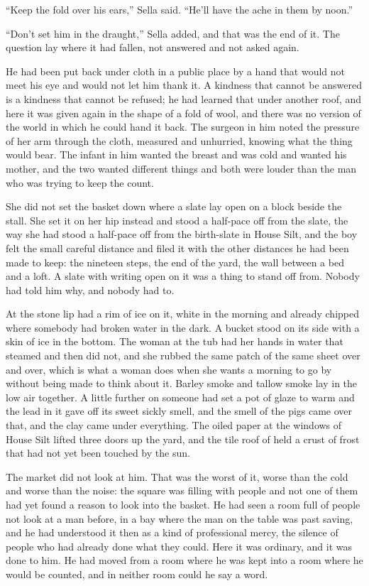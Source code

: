 “Keep the fold over his ears,” Sella said. “He'll have the ache in them by noon.”

“Don't set him in the draught,” Sella added, and that was the end of it. The question lay where it had fallen, not answered and not asked again.

He had been put back under cloth in a public place by a hand that would not meet his eye and would not let him thank it. A kindness that cannot be answered is a kindness that cannot be refused; he had learned that under another roof, and here it was given again in the shape of a fold of wool, and there was no version of the world in which he could hand it back. The surgeon in him noted the pressure of her arm through the cloth, measured and unhurried, knowing what the thing would bear. The infant in him wanted the breast and was cold and wanted his mother, and the two wanted different things and both were louder than the man who was trying to keep the count.

She did not set the basket down where a slate lay open on a block beside the stall. She set it on her hip instead and stood a half-pace off from the slate, the way she had stood a half-pace off from the birth-slate in House Silt, and the boy felt the small careful distance and filed it with the other distances he had been made to keep: the nineteen steps, the end of the yard, the wall between a bed and a loft. A slate with writing open on it was a thing to stand off from. Nobody had told him why, and nobody had to.

\scenebreak

At  the stone lip had a rim of ice on it, white in the morning and already chipped where somebody had broken water in the dark. A bucket stood on its side with a skin of ice in the bottom. The woman at the tub had her hands in water that steamed and then did not, and she rubbed the same patch of the same sheet over and over, which is what a woman does when she wants a morning to go by without being made to think about it. Barley smoke and tallow smoke lay in the low air together. A little further on someone had set a pot of glaze to warm and the lead in it gave off its sweet sickly smell, and the smell of the pigs came over that, and the clay came under everything. The oiled paper at the windows of House Silt lifted three doors up the yard, and the tile roof of  held a crust of frost that had not yet been touched by the sun.

The market did not look at him. That was the worst of it, worse than the cold and worse than the noise: the square was filling with people and not one of them had yet found a reason to look into the basket. He had seen a room full of people not look at a man before, in a bay where the man on the table was past saving, and he had understood it then as a kind of professional mercy, the silence of people who had already done what they could. Here it was ordinary, and it was done to him. He had moved from a room where he was kept into a room where he would be counted, and in neither room could he say a word.

